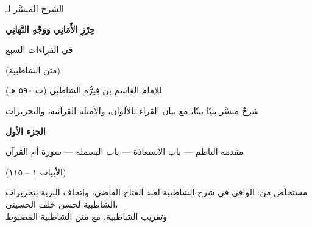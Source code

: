 \begin{titlepage}
\centering
\vspace*{1.5cm}
\begin{tcolorbox}[enhanced,colback=parchment,colframe=gold,boxrule=1.5pt,arc=4mm,
  borderline={0.5pt}{4pt}{gold},width=0.9\linewidth,center,halign=center,top=18pt,bottom=18pt]
  {\Large\color{headcolor} الشرح الميسَّر لـ}\par\medskip
  {\fontsize{34}{48}\selectfont\bfseries\color{maroon} حِرْزِ الأَمَانِي وَوَجْهِ التَّهَانِي}\par\medskip
  {\LARGE\color{headcolor} في القراءات السبع}\par\medskip
  {\Large (متن الشاطبية)}\par\bigskip
  {\large للإمام القاسم بن فِيرُّه الشاطبي (ت ٥٩٠ هـ)}
\end{tcolorbox}

\vspace{1.2cm}
{\large شرحٌ ميسَّر بيتًا بيتًا، مع بيان القراء بالألوان، والأمثلة القرآنية، والتحريرات}\par
\vspace{0.8cm}
{\large\color{maroon}\textbf{الجزء الأول}}\par
{\large مقدمة الناظم — باب الاستعاذة — باب البسملة — سورة أم القرآن}\par
{\large (الأبيات ١ – ١١٥)}\par

\vfill
{\normalsize مستخلَص من: الوافي في شرح الشاطبية لعبد الفتاح القاضي، وإتحاف البرية بتحريرات الشاطبية لحسن خلف الحسيني،\\ وتقريب الشاطبية، مع متن الشاطبية المضبوط}\par
\vspace{0.6cm}
\end{titlepage}
